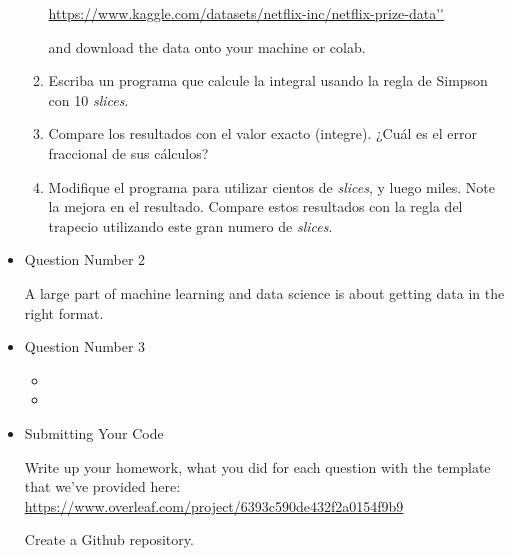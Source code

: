 \documentclass{cs6220-assignment}
\begin{document}
\begin{itemize}
\begin{enumerate}
        \url{https://www.kaggle.com/datasets/netflix-inc/netflix-prize-data''} 
 
        and download the data onto your machine or colab.
	\item Escriba un programa que calcule la integral usando la regla de Simpson con 10 \textit{slices}.
	\item Compare los resultados con el valor exacto (integre). ¿Cuál es el error fraccional de sus cálculos?
	\item Modifique el programa para utilizar cientos de \textit{slices}, y luego miles. Note la mejora en el resultado. Compare estos resultados con la regla del trapecio utilizando este gran numero de \textit{slices}.
\end{enumerate}

\item Question Number 2

\lipsum[2]

\noindent
A large part of machine learning and data science is about getting data in the right format. 

\item Question Number 3

\lipsum[23]
\begin{itemize}
	\item \lipsum[75]
    \item \lipsum[66]
\end{itemize}

\item Submitting Your Code

Write up your homework, what you did for each question with the template that we've provided here:
\url{https://www.overleaf.com/project/6393c590de432f2a0154f9b9}

Create a Github repository.


\end{itemize}
\end{document}
